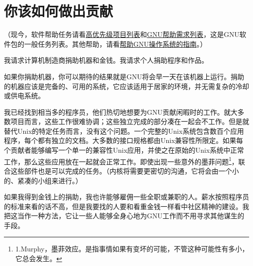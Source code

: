 \documentclass{book}
\begin{document}
\section{你该如何做出贡献}
（现今，软件帮助任务请看\href{http://fsf.org/campaigns/priority-projects}{高优先级项目列表}和\href{http://savannah.gnu.org/people/?type_id=1}{GNU帮助需求列表}，这是GNU软件包的一般任务列表。其他帮助，请看\href{http://www.gnu.org/help/help.html}{帮助GNU操作系统的指南}。）\par
我请求计算机制造商捐助机器和金钱。我请求个人捐助程序和作品。\par
如果你捐助机器，你可以期待的结果就是GNU将会早一天在该机器上运行。捐助的机器应该是完备的、可用的系统，它应该适用于居家的环境，并无需复杂的冷却或供电系统。\par
我已经找到相当多的程序员，他们热切地想要为GNU贡献闲暇时的工作。就大多数项目而言，这些工作很难协调；这些独立完成的部分凑在一起会不工作。但是就替代Unix的特定任务而言，没有这个问题。一个完整的Unix系统包含数百个应用程序，每个都有独立的文档。大多数的接口规格都由Unix兼容性所限定。如果每个贡献者能够编写一个单一的兼容性Unix应用，并使之在原始的Unix系统中正常工作，那么这些应用放在一起就会正常工作。即使出现一些意外的墨菲问题\footnote{1.Murphy，墨菲效应。是指事情如果有变坏的可能，不管这种可能性有多小，它总会发生。}，联合这些部件也是可以完成的任务。（内核将需要更密切的沟通，它将会由一个小的、紧凑的小组来进行。）\par
如果我得到金钱上的捐助，我也许能够雇佣一些全职或兼职的人。薪水按照程序员的标准来看的话不高，但是我要找的人要和看重金钱一样看中社区精神的建设。我把这当作一种方法，它让一些人能够全身心地为GNU工作而不用寻求其他谋生的手段。
\end{document}
